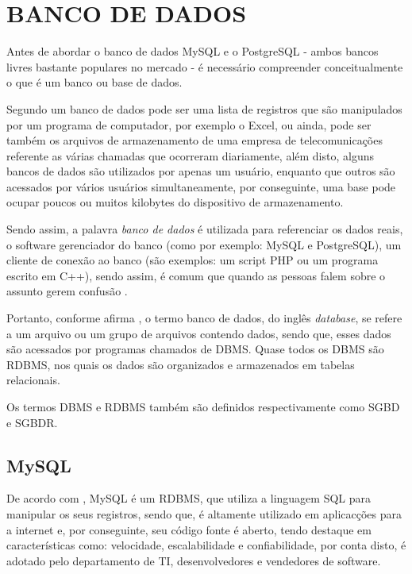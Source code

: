 \section{BANCO DE DADOS}

Antes de abordar o banco de dados \acs{MySQL} e o \acs{PostgreSQL} - ambos
bancos livres bastante populares no mercado - é necessário compreender
conceitualmente o que é um banco ou base de dados.
 
Segundo  um banco de dados pode ser uma
lista de registros que são manipulados por um programa de computador, por
exemplo o \acs{Excel}, ou ainda, pode ser também os arquivos de armazenamento
de uma empresa de telecomunicações referente as várias chamadas que ocorreram
diariamente, além disto, alguns bancos de dados são utilizados por apenas um
usuário, enquanto que outros são acessados por vários usuários
simultaneamente, por conseguinte, uma base pode ocupar poucos ou muitos
kilobytes do dispositivo de armazenamento.

Sendo assim, a palavra \textit{banco de dados} é utilizada para referenciar os
dados reais, o software gerenciador do banco (como por exemplo: \acs{MySQL} e 
\acs{PostgreSQL}), um cliente de conexão ao banco (são exemplos: um script
\acs{PHP} ou um programa escrito em C++), sendo assim, é comum que quando as 
pessoas falem sobre o assunto gerem confusão \cite{theDefinitiveGuideToMySQL5}.

Portanto, conforme afirma , o termo banco de
dados, do inglês \textit{database}, se refere a um arquivo ou um grupo de
arquivos contendo dados, sendo que, esses dados são acessados por programas 
chamados de \ac{DBMS}. Quase todos os \acs{DBMS} são \ac{RDBMS}, nos quais
os dados são organizados e armazenados em tabelas relacionais.

Os termos \acs{DBMS} e \acs{RDBMS} também são definidos respectivamente como
\ac{SGBD} e \ac{SGBDR}.

\subsection{MySQL}

De acordo com , \acs{MySQL} é um
\acs{RDBMS},  que utiliza a linguagem \ac{SQL} para manipular os seus registros, 
sendo que, é altamente utilizado em aplicacções para a internet e, por
conseguinte,  seu código fonte é aberto, tendo destaque em características
como: velocidade, escalabilidade e confiabilidade, por conta disto, é adotado
pelo departamento de \ac{TI}, desenvolvedores e vendedores de software.

